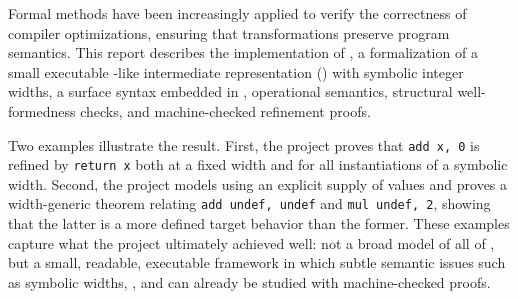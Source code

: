 Formal methods have been increasingly applied to verify the correctness of compiler optimizations,
ensuring that transformations preserve program semantics.
This report describes the implementation of \proj,
a \lean formalization of a small executable \llvm-like intermediate
representation (\ir) with symbolic integer widths, a surface syntax embedded in
\lean, operational semantics, structural well-formedness checks, and
machine-checked refinement proofs.

Two examples illustrate the result. First, the project proves that
\texttt{add x, 0} is refined by \texttt{return x} both at a fixed width and for all
instantiations of a symbolic width. Second, the project models \vundef using
an explicit supply of values and proves a width-generic theorem relating
\texttt{add undef, undef} and \texttt{mul undef, 2}, showing that the latter
is a more defined target behavior than the former. These examples capture
what the project ultimately achieved well: not a broad model of all of
\llvm, but a small, readable, executable framework in which subtle semantic
issues such as symbolic widths, \poison, and \vundef can already be studied
with machine-checked proofs.
